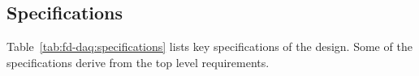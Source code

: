 
 
\subsection{Specifications}
\label{sec:fd-daq:specifications}

Table~\ref{tab:fd-daq:specifications} lists
key specifications of the  design.  Some of the
specifications derive from the  
top level requirements.




